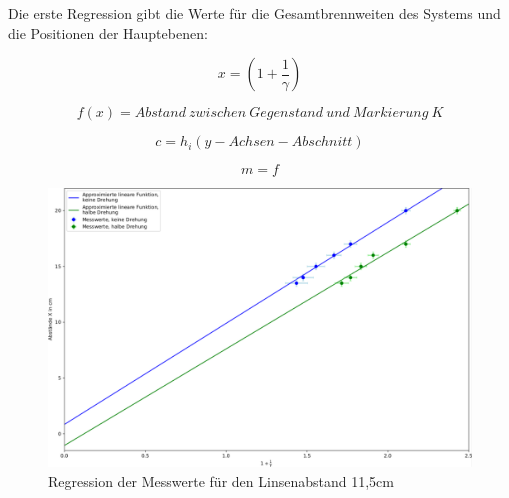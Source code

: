 Die erste Regression gibt die Werte für die Gesamtbrennweiten des Systems und die Positionen der Hauptebenen:

\begin{equation} \label{x}
    x = (1 + \frac{1}{\gamma})
\end{equation}

\begin{equation} \label{h}
    f(x) = Abstand\ zwischen\ Gegenstand\ und\ Markierung\ K
\end{equation}

\begin{equation} \label{h}
    c = h_i (y-Achsen-Abschnitt)
\end{equation}

\begin{equation} \label{h}
    m = f
\end{equation}

\begin{figure}[h!]{}
    \begin{center}
        \includegraphics[scale=0.4]{./fig/Abbe_Reg_Messreihe1_Plot.pdf}
        \caption{Regression der Messwerte für den Linsenabstand 11,5cm}
        \label{fig:Abbe-Regress-S1}
    \end{center}
\end{figure}

